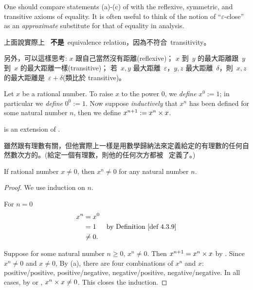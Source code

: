 \begin{remark} \label{remark 4.3.8}
One should compare statements (a)-(c) of  with the reflexive, symmetric, and transitive axioms of equality.
It is often useful to think of the notion of ``\(\varepsilon\)-close'' as an \emph{approximate} substitute for that of equality in analysis.
\end{remark}

\begin{note}
上面說實際上\  \textbf{不是}\ equivalence relation，因為不符合\ transitivity。

另外，可以這樣思考:
\(x\) 跟自己當然沒有距離(reflexive)；
\(x\) 到\  \(y\) 的最大距離跟\ \(y\) 到\ \(x\) 的最大距離一樣(transitive)；
若\ \(x, y\) 最大距離\ \(\varepsilon\)，\(y, z\) 最大距離\ \(\delta\)，則\ \(x, z\) 的最大距離是\ \(\varepsilon + \delta\)(類比於 transitive)。
\end{note}

\begin{definition}  \label{def 4.3.9}
Let \(x\) be a rational number.
To raise \(x\) to the power \(0\), we \emph{define} \(x^0 := 1\);
in particular we \emph{define} \(0^0 := 1\).
Now suppose \emph{inductively} that \(x^n\) has been defined for some natural number \(n\), then we define \(x^{n + 1} := x^n \times x\).
\end{definition}

\begin{note}
 is an extension of .
\end{note}

\begin{note}
 雖然跟有理數有關，但他實際上一樣是用數學歸納法來定義給定的有理數的任何自然數次方的。(給定一個有理數，則他的任何次方都被\  定義了。)
\end{note}

\begin{additional corollary} \label{ac 4.3.2}
If rational number \(x \neq 0\), then \(x^n \neq 0\) for any natural number \(n\).
\end{additional corollary}
\begin{proof}
We use induction on \(n\).

For \(n = 0\)
\begin{align*}
    x^n & = x^0 \\
        & = 1 & \text{by \DEF{4.3.9}} \\
        & \neq 0.
\end{align*}

Suppose for some natural number \(n \ge 0\), \(x^n \neq 0\).
Then \(x^{n + 1} = x^n \times x\) by .
Since \(x^n \neq 0\) and \(x \neq 0\), By (a), there are four combinations of \(x^n\) and \(x\): positive/positive, positive/negative, negative/positive, negative/negative.
In all cases, by  or , \(x^n \times x \neq 0\).
This closes the induction.
\end{proof}

